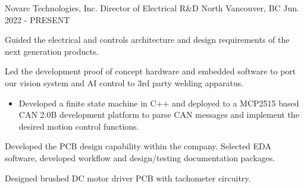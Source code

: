 


\begin{cventries}

    \cventry
    {Novarc Technologies, Inc.} %
    {Director of Electrical R\&D} %
    {North Vancouver, BC} %
    {Jun. 2022 - PRESENT} %
    { %
        \begin{cvitems}
            \item {Guided the electrical and controls architecture and design requirements of the next generation products.}
            \item {Led the development proof of concept hardware and embedded software to port our vision system and AI control to 3rd party
                        welding apparatus.}
            \begin{itemize}
                \item {Developed a finite state machine in C++ and deployed to a MCP2515 based CAN 2.0B development platform to parse CAN messages and implement the
                      desired motion control functions.}
            \end{itemize}
            \item {Developed the PCB design capability within the company. Selected EDA software, developed workflow and design/testing documentation packages.}
            \item {Designed brushed DC motor driver PCB with tachometer circuitry.}
        \end{cvitems}
    }



\end{cventries}
